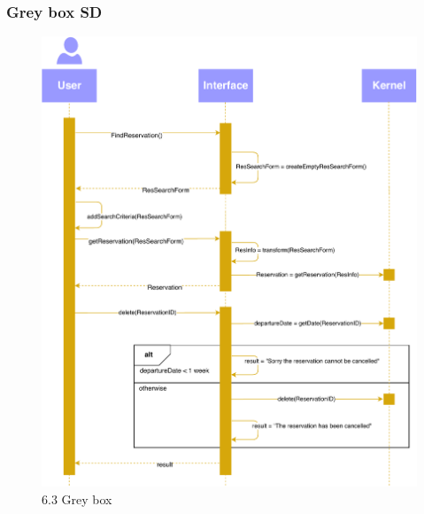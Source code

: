 \subsubsection{Grey box SD}
\creator{\studentB}
\updater{\studentC}
\begin{figure}[H]
    \centering
\includegraphics[scale=0.7]{Iteration_3/Files/UC3_gb.pdf}
    \caption{6.3 Grey box}
    \label{fig:6.3 Greybox}
\end{figure}

